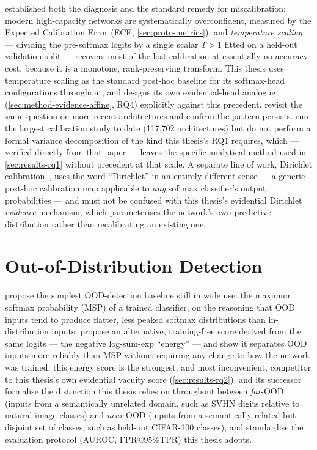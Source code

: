 \documentclass{iutbscthesis}
\begin{document}
\textcite{guo2017calibration} established both the diagnosis and the standard remedy for miscalibration: modern high-capacity networks are systematically overconfident, measured by the Expected Calibration Error (ECE, \autoref{sec:proto-metrics}), and \emph{temperature scaling} — dividing the pre-softmax logits by a single scalar $T > 1$ fitted on a held-out validation split — recovers most of the lost calibration at essentially no accuracy cost, because it is a monotone, rank-preserving transform. This thesis uses temperature scaling as the standard post-hoc baseline for its softmax-head configurations throughout, and designs its own evidential-head analogue (\autoref{sec:method-evidence-affine}, RQ4) explicitly against this precedent. \textcite{minderer2021revisiting} revisit the same question on more recent architectures and confirm the pattern persists. \textcite{tao2024benchmarkcalibration} run the largest calibration study to date (117{,}702 architectures) but do not perform a formal variance decomposition of the kind this thesis's RQ1 requires, which — verified directly from that paper — leaves the specific analytical method used in \autoref{sec:results-rq1} without precedent at that scale. A separate line of work, Dirichlet calibration~\cite{kull2019dirichlet}, uses the word ``Dirichlet'' in an entirely different sense — a generic post-hoc calibration map applicable to \emph{any} softmax classifier's output probabilities — and must not be confused with this thesis's evidential Dirichlet \emph{evidence} mechanism, which parameterises the network's own predictive distribution rather than recalibrating an existing one.

\section{Out-of-Distribution Detection}
\label{sec:related-ood}

\textcite{hendrycks2017baseline} propose the simplest OOD-detection baseline still in wide use: the maximum softmax probability (MSP) of a trained classifier, on the reasoning that OOD inputs tend to produce flatter, less peaked softmax distributions than in-distribution inputs. \textcite{liu2020energy} propose an alternative, training-free score derived from the same logits — the negative log-sum-exp ``energy'' — and show it separates OOD inputs more reliably than MSP without requiring any change to how the network was trained; this energy score is the strongest, and most inconvenient, competitor to this thesis's own evidential vacuity score (\autoref{sec:results-rq2}). \textcite{yang2022openood} and its successor \textcite{zhang2024openoodv15} formalise the distinction this thesis relies on throughout between \emph{far}-OOD (inputs from a semantically unrelated domain, such as SVHN digits relative to natural-image classes) and \emph{near}-OOD (inputs from a semantically related but disjoint set of classes, such as held-out CIFAR-100 classes), and standardise the evaluation protocol (AUROC, FPR@95\%TPR) this thesis adopts.
\end{document}
